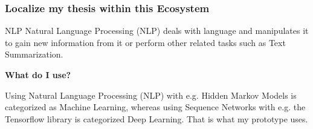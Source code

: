 \documentclass{beamer}
\begin{document}

\begin{frame}
\frametitle{Localize my thesis within this Ecosystem}
\begin{block}{NLP}
	Natural Language Processing (NLP) deals with language and manipulates it to gain new information from it or perform other related tasks such as Text Summarization.
\end{block}

\begin{center}
	\textbf{What do I use?} \\
\end{center}

Using Natural Language Processing (NLP) with e.g. Hidden Markov Models is categorized as Machine Learning, whereas using Sequence Networks with e.g. the Tensorflow library is categorized Deep Learning. That is what my prototype uses.

\end{frame}

\end{document}
